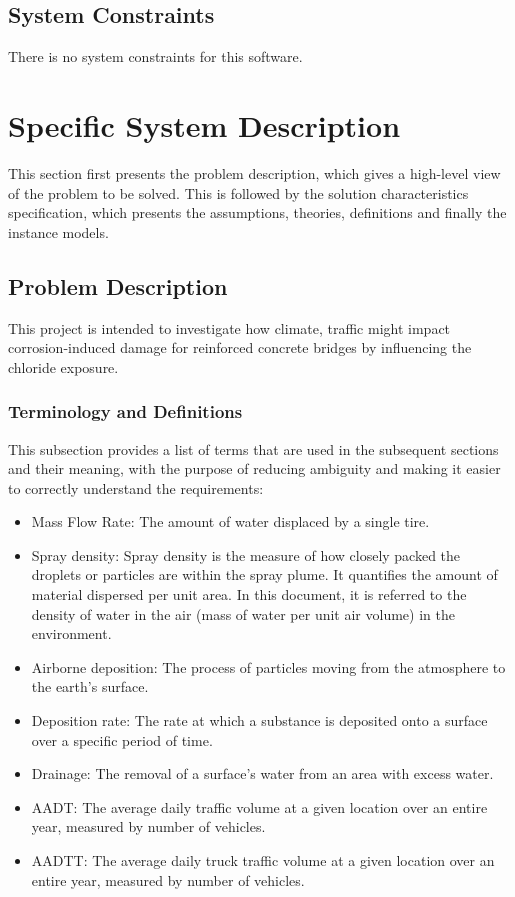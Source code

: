 \documentclass[12pt]{article}
\begin{document}
\subsection{System Constraints}
There is no system constraints for this software.
  
\section{Specific System Description}

This section first presents the problem description, which gives a high-level
view of the problem to be solved.  This is followed by the solution characteristics
specification, which presents the assumptions, theories, definitions and finally
the instance models.  

\subsection{Problem Description} \label{Sec_pd}
This project is intended to investigate how climate, traffic might impact corrosion-induced damage for reinforced concrete bridges by influencing the chloride exposure.

\subsubsection{Terminology and  Definitions}
This subsection provides a list of terms that are used in the subsequent
sections and their meaning, with the purpose of reducing ambiguity and making it
easier to correctly understand the requirements:

\begin{itemize}
\item Mass Flow Rate: The amount of water displaced by a single tire.
\item Spray density: Spray density is the measure of how closely packed the droplets or particles are within the spray plume. It quantifies the amount of material dispersed per unit area. In this document, it is referred to the density of water in the air (mass of water per unit air volume) in the environment.
\item Airborne deposition: The process of particles moving from the atmosphere to the earth's surface.
\item Deposition rate: The rate at which a substance is deposited onto a surface over a specific period of time.
\item Drainage: The removal of a surface's water from an area with excess water.
\item AADT:  The average daily traffic volume at a given location over an entire year, measured by number of vehicles.
\item AADTT:  The average daily truck traffic volume at a given location over an entire year, measured by number of vehicles.

\end{itemize}
\end{document}
